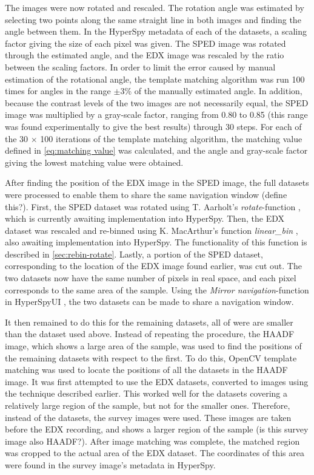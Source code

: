 The images were now rotated and rescaled. The rotation angle was estimated by selecting two points along the same straight line in both images and finding the angle between them. In the HyperSpy metadata of each of the datasets, a scaling factor giving the size of each pixel was given. The SPED image was rotated through the estimated angle, and the EDX image was rescaled by the ratio between the scaling factors. In order to limit the error caused by manual estimation of the rotational angle, the template matching algorithm was run 100 times for angles in the range $\pm3$\% of the manually estimated angle. In addition, because the contrast levels of the two images are not necessarily equal, the SPED image was multiplied by a gray-scale factor, ranging from 0.80 to 0.85 (this range was found experimentally to give the best results) through 30 steps. For each of the 30 $\times$ 100 iterations of the template matching algorithm, the matching value defined in \cref{eq:matching value} was calculated, and the angle and gray-scale factor giving the lowest matching value were obtained.

After finding the position of the EDX image in the SPED image, the full datasets were processed to enable them to share the same navigation window (define this?). First, the SPED dataset was rotated using T. Aarholt's \textit{rotate}-function \cite{aarholt-rotation}, which is currently awaiting implementation into HyperSpy. Then, the EDX dataset was rescaled and re-binned using K. MacArthur's function \textit{linear\_bin} \cite{kate-binning}, also awaiting implementation into HyperSpy. The functionality of this function is described in \cref{sec:rebin-rotate}. Lastly, a portion of the SPED dataset, corresponding to the location of the EDX image found earlier, was cut out. The two datasets now have the same number of pixels in real space, and each pixel corresponds to the same area of the sample. Using the \textit{Mirror navigation}-function in HyperSpyUI \cite{hyperspyUI}, the two datasets can be made to share a navigation window. 

It then remained to do this for the remaining datasets, all of were are smaller than the dataset used above. Instead of repeating the procedure, the HAADF image, which shows a large area of the sample, was used to find the positions of the remaining datasets with respect to the first. To do this, OpenCV template matching was used to locate the positions of all the datasets in the HAADF image. It was first attempted to use the EDX datasets, converted to images using the technique described earlier. This worked well for the datasets covering a relatively large region of the sample, but not for the smaller ones. Therefore, instead of the datasets, the survey images were used. These images are taken before the EDX recording, and shows a larger region of the sample (is this survey image also HAADF?). After image matching was complete, the matched region was cropped to the actual area of the EDX dataset. The coordinates of this area were found in the survey image's metadata in HyperSpy. 

